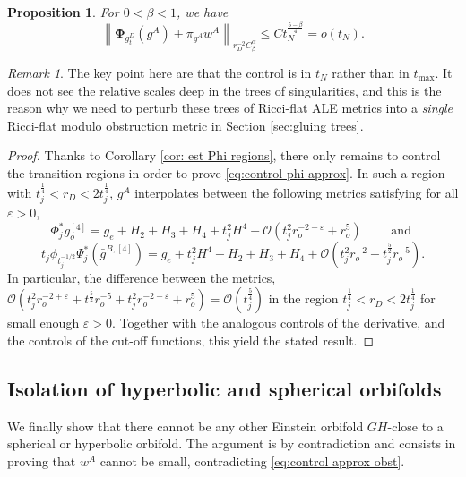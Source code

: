 \documentclass[11pt,reqno]{amsart}
\numberwithin{equation}{section}
\newtheorem{prop}[thm]{Proposition}
\theoremstyle{definition}
\theoremstyle{remark}
\newtheorem{remark}[thm]{Remark}
\begin{document}
\begin{prop}\label{prop:estimate approx}
    For $0<\beta<1$, we have 
    \begin{equation}\label{eq:control phi  approx}
        \left\|\mathbf{\Phi}_{g^D_{t }}(g^A) + \pi_{g^A}w^A \right\|_{r_D^{-2}C^\alpha_\beta}\leqslant C t_N^{\frac{5-\beta}4} = o(t_N).
    \end{equation}
\end{prop}
\begin{remark}
    The key point here are that the control is in $t_N$ rather than in $t_{\max}$. It does not see the relative scales deep in the trees of singularities, and this is the reason why we need to perturb these trees of Ricci-flat ALE metrics into a \emph{single} Ricci-flat modulo obstruction metric in Section \ref{sec:gluing trees}.
\end{remark}
\begin{proof}
    Thanks to Corollary \ref{cor: est Phi regions}, there only remains to control the transition regions in order to prove \eqref{eq:control phi  approx}. In such a region with $t_j^\frac14<r_D<2t_j^\frac14$, $g^A$ interpolates between the following metrics satisfying for all $\varepsilon>0$,
    \begin{equation}
        \Phi^*_jg_o^{[4]} = g_{e} + H_2+ H_3+H_4 + t_j^2 H^4 + \mathcal{O}(t_j^2r_o^{-2-\varepsilon} + r_o^5) \qquad \text{ and }
    \end{equation}
    \begin{equation}
t_j\phi_{t_j^{-1/2}}\Psi^*_j(\bar{g}^{B,[4]}) =  g_{e} + t_j^2H^4+H_2+H_3+H_4+ \mathcal{O}(t_j^2r_o^{-2} + t_j^{\frac52}r_o^{-5}).
    \end{equation}
    In particular, the difference between the metrics, $\mathcal{O}(t_j^2r_o^{-2+\varepsilon} + t^{\frac52}r_o^{-5} + t_j^2r_o^{-2-\varepsilon} + r_o^5) = \mathcal{O}(t_j^\frac54)$ in the region $t_j^\frac14<r_D<2t_j^\frac14$ for small enough $\varepsilon>0$. Together with the analogous controls of the derivative, and the controls of the cut-off functions, this yield the stated result.
\end{proof}

\subsection{Isolation of hyperbolic and spherical orbifolds}\label{sec: isolation hy sph orb}

We finally show that there cannot be any other Einstein orbifold $GH$-close to a spherical or hyperbolic orbifold. The argument is by contradiction and consists in proving that $w^A$ cannot be small, contradicting \eqref{eq:control approx obst}.
\end{document}
